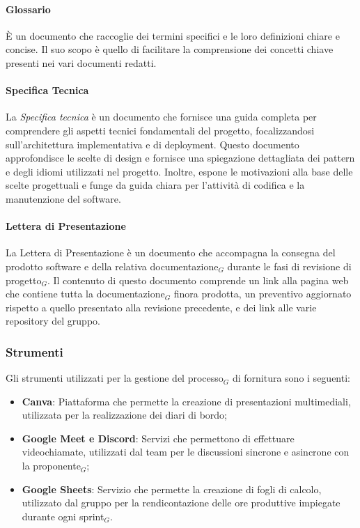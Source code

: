 \documentclass[10pt]{article}
\begin{document}
\begin{justify}
        \paragraph{Glossario}
        È un documento che raccoglie dei termini specifici e le loro definizioni chiare e concise. Il suo scopo è quello di facilitare la comprensione dei concetti chiave presenti nei vari documenti redatti.\\

        \paragraph{Specifica Tecnica}
        La \textit{Specifica tecnica} è un documento che fornisce una guida completa per comprendere gli aspetti tecnici fondamentali del progetto, focalizzandosi sull'architettura implementativa e di deployment. Questo documento approfondisce le scelte di design e fornisce una spiegazione dettagliata dei pattern e degli idiomi utilizzati nel progetto. Inoltre, espone le motivazioni alla base delle scelte progettuali e funge da guida chiara per l'attività di codifica e la manutenzione del software.\\

        \paragraph{Lettera di Presentazione}
        La Lettera di Presentazione è un documento che accompagna la consegna del prodotto software e della relativa documentazione$_G$ durante le fasi di revisione di progetto$_G$. Il contenuto di questo documento comprende un link alla pagina web che contiene tutta la documentazione$_G$ finora prodotta, un preventivo aggiornato rispetto a quello presentato alla revisione precedente, e dei link alle varie repository del gruppo.\\

    \subsubsection{Strumenti}
    Gli strumenti utilizzati per la gestione del processo$_G$ di fornitura sono i seguenti:
    \begin{itemize}
        \item \textbf{Canva}: Piattaforma che permette la creazione di presentazioni multimediali, utilizzata per la realizzazione dei diari di bordo;
        \item \textbf{Google Meet e Discord}: Servizi che permettono di effettuare videochiamate, utilizzati dal team per le discussioni sincrone e asincrone con la proponente$_G$;
        \item \textbf{Google Sheets}: Servizio che permette la creazione di fogli di calcolo, utilizzato dal gruppo per la rendicontazione delle ore produttive impiegate durante ogni sprint$_G$.
    \end{itemize}


\end{justify}
\end{document}
